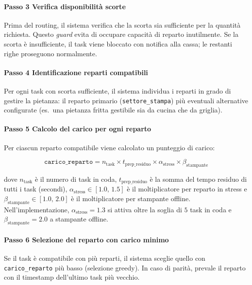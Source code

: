 \paragraph{Passo 3  Verifica disponibilità scorte}
Prima del routing, il sistema verifica che la scorta sia sufficiente per la quantità
richiesta. Questo \textit{guard} evita di occupare capacità di reparto inutilmente.
Se la scorta è insufficiente, il task viene bloccato con notifica alla cassa; le
restanti righe proseguono normalmente.

\paragraph{Passo 4  Identificazione reparti compatibili}
Per ogni task con scorta sufficiente, il sistema individua i reparti in grado di
gestire la pietanza: il reparto primario (\texttt{settore\_stampa}) più eventuali
alternative configurate (es.\ una pietanza fritta gestibile sia da cucina che da
griglia).

\paragraph{Passo 5  Calcolo del carico per ogni reparto}
Per ciascun reparto compatibile viene calcolato un punteggio di carico:

\begin{equation}
\label{eq:carico}
\mathtt{carico\_reparto} = n_{\text{task}} \times t_{\text{prep\_residuo}} \times \alpha_{\text{stress}} \times \beta_{\text{stampante}}
\end{equation}

\noindent dove $n_{\text{task}}$ è il numero di task in coda, $t_{\text{prep\_residuo}}$
è la somma del tempo residuo di tutti i task (secondi), $\alpha_{\text{stress}} \in
[1.0,\,1.5]$ è il moltiplicatore per reparto in stress e $\beta_{\text{stampante}}
\in [1.0,\,2.0]$ è il moltiplicatore per stampante offline. Nell'implementazione,
$\alpha_{\text{stress}} = 1.3$ si attiva oltre la soglia di $5$ task in coda e
$\beta_{\text{stampante}} = 2.0$ a stampante offline.

\paragraph{Passo 6  Selezione del reparto con carico minimo}
Se il task è compatibile con più reparti, il sistema sceglie quello con
\texttt{carico\_reparto} più basso (selezione greedy). In caso di parità, prevale
il reparto con il timestamp dell'ultimo task più vecchio.

